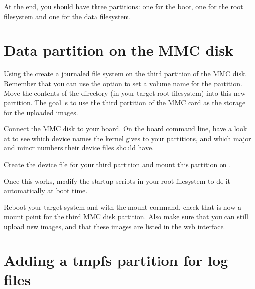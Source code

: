 At the end, you should have three partitions: one for the boot, one
for the root filesystem and one for the data filesystem.

\section{Data partition on the MMC disk}


Using the  create a journaled file system on the third
partition of the MMC disk. Remember that you can use the 
option to set a volume name for the partition. Move the contents of
the  directory (in your target root filesystem)
into this new partition. The goal is to use the third partition of the
MMC card as the storage for the uploaded images.

Connect the MMC disk to your board. On the board command line,
have a look at  to see which device names
the kernel gives to your partitions, and which major and minor numbers
their device files should have.

Create the device file for your third partition and mount this partition
on .

Once this works, modify the startup scripts in your root filesystem
to do it automatically at boot time.

Reboot your target system and with the mount command, check that
 is now a mount point for the third MMC disk
partition. Also make sure that you can still upload new images, and
that these images are listed in the web interface.

\section{Adding a tmpfs partition for log files}

